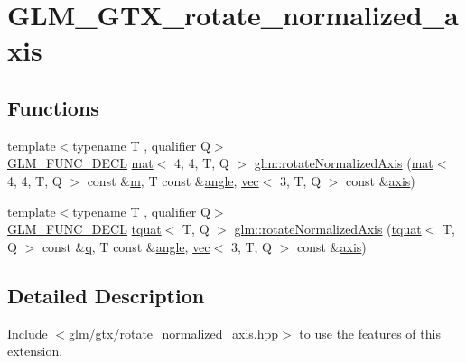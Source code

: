 \hypertarget{group__gtx__rotate__normalized__axis}{}\section{G\+L\+M\+\_\+\+G\+T\+X\+\_\+rotate\+\_\+normalized\+\_\+axis}
\label{group__gtx__rotate__normalized__axis}
\subsection*{Functions}
\begin{DoxyCompactItemize}
\item 
{\footnotesize template$<$typename T , qualifier Q$>$ }\\\mbox{\hyperlink{setup_8hpp_ab2d052de21a70539923e9bcbf6e83a51}{G\+L\+M\+\_\+\+F\+U\+N\+C\+\_\+\+D\+E\+CL}} \mbox{\hyperlink{structglm_1_1mat}{mat}}$<$ 4, 4, T, Q $>$ \mbox{\hyperlink{group__gtx__rotate__normalized__axis_ga50efd7ebca0f7a603bb3cc11e34c708d}{glm\+::rotate\+Normalized\+Axis}} (\mbox{\hyperlink{structglm_1_1mat}{mat}}$<$ 4, 4, T, Q $>$ const \&\mbox{\hyperlink{_s_d_l__opengl__glext_8h_af593500c283bf1a787a6f947f503a5c2}{m}}, T const \&\mbox{\hyperlink{_s_d_l__opengl__glext_8h_a9e06c1f76a20fed54ca742cd25cb02c4}{angle}}, \mbox{\hyperlink{structglm_1_1vec}{vec}}$<$ 3, T, Q $>$ const \&\mbox{\hyperlink{group__gtc__quaternion_gaaf2707d3081789ce097daaa6e54d5287}{axis}})
\item 
{\footnotesize template$<$typename T , qualifier Q$>$ }\\\mbox{\hyperlink{setup_8hpp_ab2d052de21a70539923e9bcbf6e83a51}{G\+L\+M\+\_\+\+F\+U\+N\+C\+\_\+\+D\+E\+CL}} \mbox{\hyperlink{structglm_1_1tquat}{tquat}}$<$ T, Q $>$ \mbox{\hyperlink{group__gtx__rotate__normalized__axis_gad5bb8a155ee52fd349b88cec3a843600}{glm\+::rotate\+Normalized\+Axis}} (\mbox{\hyperlink{structglm_1_1tquat}{tquat}}$<$ T, Q $>$ const \&\mbox{\hyperlink{_s_d_l__opengl_8h_a8fc1e7b9baaae687804c7eed46ca09c6}{q}}, T const \&\mbox{\hyperlink{_s_d_l__opengl__glext_8h_a9e06c1f76a20fed54ca742cd25cb02c4}{angle}}, \mbox{\hyperlink{structglm_1_1vec}{vec}}$<$ 3, T, Q $>$ const \&\mbox{\hyperlink{group__gtc__quaternion_gaaf2707d3081789ce097daaa6e54d5287}{axis}})
\end{DoxyCompactItemize}


\subsection{Detailed Description}
Include $<$\mbox{\hyperlink{rotate__normalized__axis_8hpp}{glm/gtx/rotate\+\_\+normalized\+\_\+axis.\+hpp}}$>$ to use the features of this extension.


